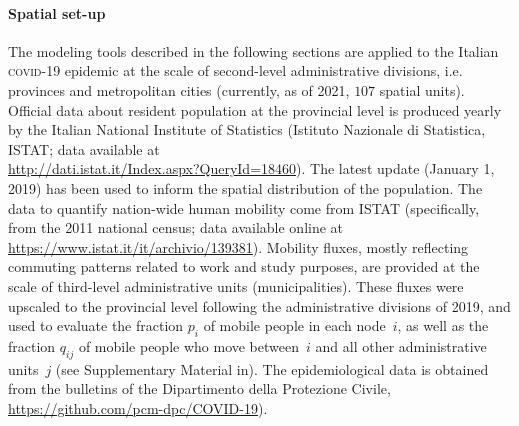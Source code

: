 

\paragraph{Spatial set-up} 
The modeling tools described in the following sections are applied to the Italian \textsc{covid}-19 epidemic at the scale of second-level administrative divisions, i.e. provinces and metropolitan cities (currently, as of 2021, $107$ spatial units). Official data about resident population at the provincial level is produced yearly by the Italian National Institute of Statistics (Istituto Nazionale di Statistica, ISTAT; data available at\\ \url{http://dati.istat.it/Index.aspx?QueryId=18460}). The latest update (January 1, 2019) has been used to inform the spatial distribution of the population. %
The data to quantify nation-wide human mobility come from ISTAT (specifically, from the 2011 national census; data available online at \url{https://www.istat.it/it/archivio/139381}). Mobility fluxes, mostly reflecting commuting patterns related to work and study purposes, are provided at the scale of third-level administrative units (municipalities)\cite{Pepe:COVID19OutbreakResponse:2020,Vollmer:Report20Using:2020}. These fluxes were upscaled to the provincial level following the administrative divisions of 2019, and used to evaluate the fraction $p_i$ of mobile people in each node~$i$, as well as the fraction $q_{ij}$ of mobile people who move between~$i$ and all other administrative units~$j$ (see Supplementary Material in\cite{Gatto:SpreadDynamicsCOVID19:2020}).
The epidemiological data is obtained from the bulletins of the Dipartimento della Protezione Civile, \url{https://github.com/pcm-dpc/COVID-19}).

